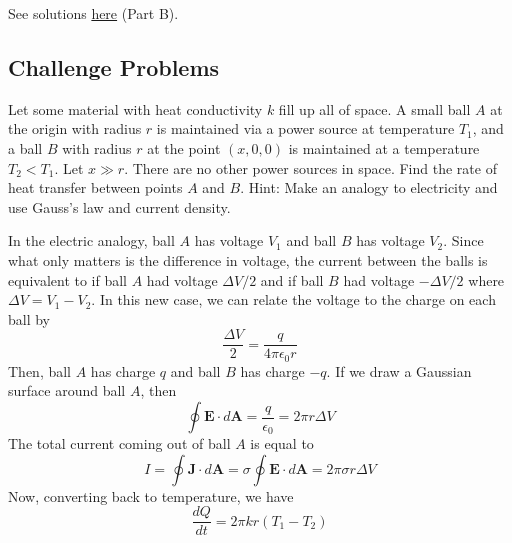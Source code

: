 \documentclass[11pt]{scrartcl}
\begin{document}
\begin{sol}
    See solutions \href{https://ipho.olimpicos.net/pdf/IPhO_2014_S1.pdf}{here} (Part B).
\end{sol}

\subsection{Challenge Problems}

\begin{prob}
    Let some material with heat conductivity $k$ fill up all of space. A small ball $A$ at the origin with radius $r$ is maintained via a power source at temperature $T_1$, and a ball $B$ with radius $r$ at the point $(x,0,0)$ is maintained at a temperature $T_2<T_1$. Let $x\gg r$. There are no other power sources in space. Find the rate of heat transfer between points $A$ and $B$. Hint: Make an analogy to electricity and use Gauss's law and current density.  
\end{prob}

\begin{sol}
    In the electric analogy, ball $A$ has voltage $V_1$ and ball $B$ has voltage $V_2$. Since what only matters is the difference in voltage, the current between the balls is equivalent to if ball $A$ had voltage $\Delta V/2$ and if ball $B$ had voltage $-\Delta V/2$ where $\Delta V=V_1-V_2$. In this new case, we can relate the voltage to the charge on each ball by $$\frac{\Delta V}{2}=\frac{q}{4\pi\epsilon_0 r}$$Then, ball $A$ has charge $q$ and ball $B$ has charge $-q$. If we draw a Gaussian surface around ball $A$, then $$\oint\mathbf E\cdot d\mathbf A=\frac{q}{\epsilon_0}=2\pi r\Delta V$$The total current coming out of ball $A$ is equal to $$I=\oint \mathbf J\cdot d\mathbf A=\sigma\oint\mathbf E\cdot d\mathbf A=2\pi \sigma r\Delta V$$ Now, converting back to temperature, we have $$\frac{dQ}{dt}=\boxed{2\pi kr(T_1-T_2)}$$
\end{sol}
\end{document}
